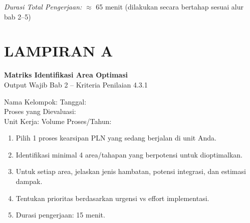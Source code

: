\documentclass[12pt,a4paper]{report}
\begin{document}
\vspace{0.4cm}
\noindent\textit{\color{plnblue}Durasi Total Pengerjaan:} $\approx$ 65 menit (dilakukan secara bertahap sesuai alur bab 2--5)


\newpage
\section*{\color{plnblue} LAMPIRAN A}
{\Large\bfseries Matriks Identifikasi Area Optimasi}\\[0.15cm]
{\normalsize\color{medgray}Output Wajib Bab 2 -- Kriteria Penilaian 4.3.1}

\vspace{0.4cm}

\noindent Nama Kelompok: \fillline[5cm] \quad Tanggal: \fillline[3cm]\\[0.25cm]
Proses yang Dievaluasi: \fillline[9cm]\\[0.25cm]
Unit Kerja: \fillline[5cm] \quad Volume Proses/Tahun: \fillline[3cm]

\begin{wsinstruksibox}
\begin{enumerate}
    \item Pilih 1 proses kearsipan PLN yang sedang berjalan di unit Anda.
    \item Identifikasi minimal 4 area/tahapan yang berpotensi untuk dioptimalkan.
    \item Untuk setiap area, jelaskan jenis hambatan, potensi integrasi, dan estimasi dampak.
    \item Tentukan prioritas berdasarkan urgensi vs effort implementasi.
    \item Durasi pengerjaan: 15 menit.
\end{enumerate}
\end{wsinstruksibox}

\vspace{0.4cm}


\vspace{0.2cm}
\end{document}
